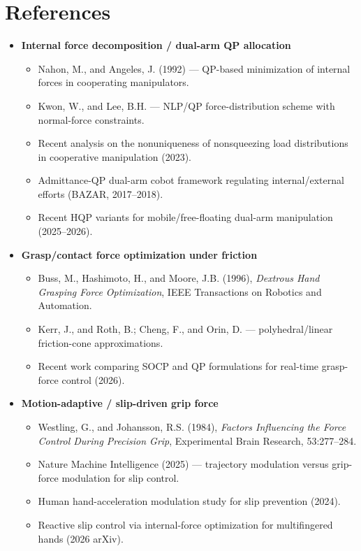\documentclass[conference]{IEEEtran}
\begin{document}
\section*{References}
\begin{itemize}
    \item \textbf{Internal force decomposition / dual-arm QP allocation}
    \begin{itemize}
        \item Nahon, M., and Angeles, J. (1992) --- QP-based minimization of internal forces in cooperating manipulators.
        \item Kwon, W., and Lee, B.H. --- NLP/QP force-distribution scheme with normal-force constraints.
        \item Recent analysis on the nonuniqueness of nonsqueezing load distributions in cooperative manipulation (2023).
        \item Admittance-QP dual-arm cobot framework regulating internal/external efforts (BAZAR, 2017--2018).
        \item Recent HQP variants for mobile/free-floating dual-arm manipulation (2025--2026).
    \end{itemize}

    \item \textbf{Grasp/contact force optimization under friction}
    \begin{itemize}
        \item Buss, M., Hashimoto, H., and Moore, J.B. (1996), \emph{Dextrous Hand Grasping Force Optimization}, IEEE Transactions on Robotics and Automation.
        \item Kerr, J., and Roth, B.; Cheng, F., and Orin, D. --- polyhedral/linear friction-cone approximations.
        \item Recent work comparing SOCP and QP formulations for real-time grasp-force control (2026).
    \end{itemize}

    \item \textbf{Motion-adaptive / slip-driven grip force}
    \begin{itemize}
        \item Westling, G., and Johansson, R.S. (1984), \emph{Factors Influencing the Force Control During Precision Grip}, Experimental Brain Research, 53:277--284.
        \item Nature Machine Intelligence (2025) --- trajectory modulation versus grip-force modulation for slip control.
        \item Human hand-acceleration modulation study for slip prevention (2024).
        \item Reactive slip control via internal-force optimization for multifingered hands (2026 arXiv).
    \end{itemize}


\end{itemize}
\end{document}

